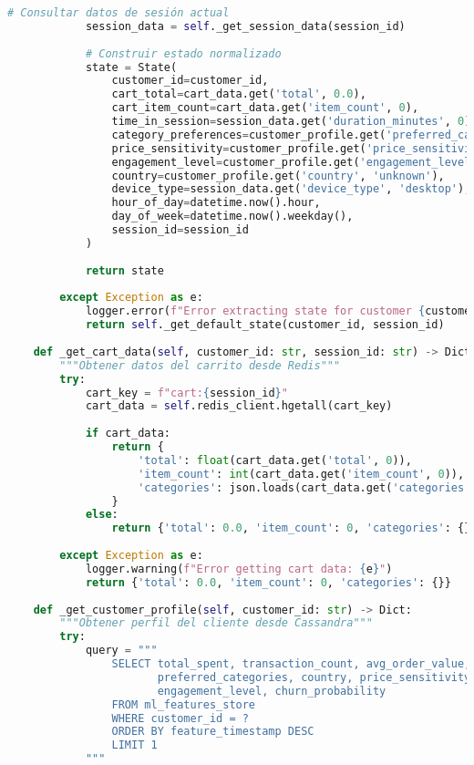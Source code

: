 \begin{lstlisting}[language=python, caption=Implementación Completa del Agente Q-Learning, label=lst:ql_implementation]
            # Consultar datos de sesión actual
            session_data = self._get_session_data(session_id)
            
            # Construir estado normalizado
            state = State(
                customer_id=customer_id,
                cart_total=cart_data.get('total', 0.0),
                cart_item_count=cart_data.get('item_count', 0),
                time_in_session=session_data.get('duration_minutes', 0),
                category_preferences=customer_profile.get('preferred_categories', {}),
                price_sensitivity=customer_profile.get('price_sensitivity', 0.5),
                engagement_level=customer_profile.get('engagement_level', 0.5),
                country=customer_profile.get('country', 'unknown'),
                device_type=session_data.get('device_type', 'desktop'),
                hour_of_day=datetime.now().hour,
                day_of_week=datetime.now().weekday(),
                session_id=session_id
            )
            
            return state
            
        except Exception as e:
            logger.error(f"Error extracting state for customer {customer_id}: {e}")
            return self._get_default_state(customer_id, session_id)
    
    def _get_cart_data(self, customer_id: str, session_id: str) -> Dict:
        """Obtener datos del carrito desde Redis"""
        try:
            cart_key = f"cart:{session_id}"
            cart_data = self.redis_client.hgetall(cart_key)
            
            if cart_data:
                return {
                    'total': float(cart_data.get('total', 0)),
                    'item_count': int(cart_data.get('item_count', 0)),
                    'categories': json.loads(cart_data.get('categories', '{}'))
                }
            else:
                return {'total': 0.0, 'item_count': 0, 'categories': {}}
                
        except Exception as e:
            logger.warning(f"Error getting cart data: {e}")
            return {'total': 0.0, 'item_count': 0, 'categories': {}}
    
    def _get_customer_profile(self, customer_id: str) -> Dict:
        """Obtener perfil del cliente desde Cassandra"""
        try:
            query = """
                SELECT total_spent, transaction_count, avg_order_value, 
                       preferred_categories, country, price_sensitivity_score,
                       engagement_level, churn_probability
                FROM ml_features_store 
                WHERE customer_id = ? 
                ORDER BY feature_timestamp DESC 
                LIMIT 1
            """
            

\end{lstlisting}
